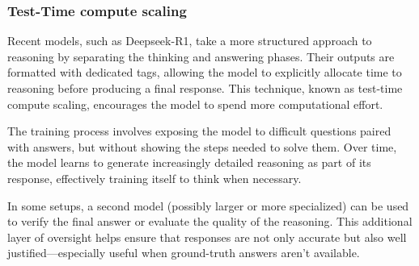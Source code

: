 \subsubsection{Test-Time compute scaling}
Recent models, such as Deepseek-R1, take a more structured approach to reasoning by separating the thinking and answering phases. 
Their outputs are formatted with dedicated tags, allowing the model to explicitly allocate time to reasoning before producing a final response.
This technique, known as test-time compute scaling, encourages the model to spend more computational effort. 

The training process involves exposing the model to difficult questions paired with answers, but without showing the steps needed to solve them. 
Over time, the model learns to generate increasingly detailed reasoning as part of its response, effectively training itself to think when necessary.

In some setups, a second model (possibly larger or more specialized) can be used to verify the final answer or evaluate the quality of the reasoning. 
This additional layer of oversight helps ensure that responses are not only accurate but also well justified—especially useful when ground-truth answers aren't available.

